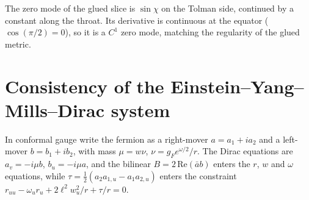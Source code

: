 The zero mode of the glued slice is $\sin\chi$ on the Tolman side, continued by a constant along the throat. Its derivative is continuous at the equator ($\cos(\pi/2)=0$), so it is a $C^1$ zero mode, matching the regularity of the glued metric.

\section{Consistency of the Einstein--Yang--Mills--Dirac system}

In conformal gauge write the fermion as a right-mover $a=a_1+ia_2$ and a left-mover $b=b_1+ib_2$, with mass $\mu=w\nu$, $\nu=g_Fe^{\omega/2}/r$. The Dirac equations are $a_v=-i\mu b$, $b_u=-i\mu a$, and the bilinear $B=2\,\mathrm{Re}(\bar ab)$ enters the $r$, $w$ and $\omega$ equations, while $\tau=\frac12(a_2a_{1,u}-a_1a_{2,u})$ enters the constraint $r_{uu}-\omega_ur_u+2\ell^2w_u^2/r+\tau/r=0$.

